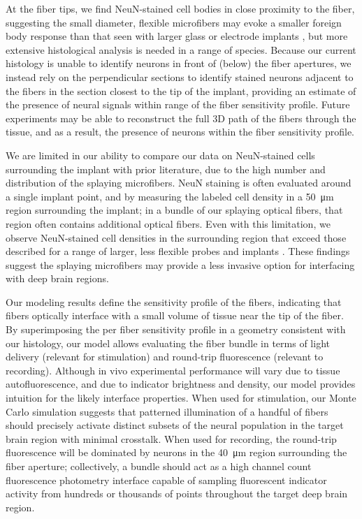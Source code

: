 At the fiber tips, we find NeuN-stained cell bodies in close 
proximity to the fiber, suggesting the small diameter, 
flexible microfibers may evoke a smaller foreign body response 
than that seen with larger glass or electrode implants 
\cite{McConnell:2009hr,Lee:2016ko}, but more extensive 
histological analysis is needed in a range of species. Because 
our current histology is unable to identify neurons in front of 
(below) the fiber apertures, we instead rely on the perpendicular 
sections to identify stained neurons adjacent to the fibers in 
the section closest to the tip of the implant, providing an 
estimate of the presence of neural signals within range of the 
fiber sensitivity profile. Future experiments may be able to 
reconstruct the full 3D path of the fibers through the tissue, 
and as a result, the presence of neurons within the fiber 
sensitivity profile. 

We are limited in our ability to compare our data on 
NeuN-stained cells surrounding the implant with prior 
literature, due to the high number and distribution of the 
splaying microfibers. NeuN staining is often evaluated around a 
single implant point, and by measuring the labeled cell density 
in a 50~\si{\micro\meter} region surrounding the implant; in a 
bundle of our splaying optical fibers, that region often 
contains additional optical fibers. Even with this limitation, 
we observe NeuN-stained cell densities in the surrounding region 
that exceed those described for a range of larger, less flexible 
probes and implants 
\cite{Biran:2005dm,Winslow:2010bn,Welkenhuysen:2011cu,Harris:2011dy}. 
These findings suggest the splaying microfibers may provide a less 
invasive option for interfacing with deep brain regions.

Our modeling results define the sensitivity profile of the 
fibers, indicating that fibers optically interface with a 
small volume of tissue near the tip of the fiber. By 
superimposing the per fiber sensitivity profile in a geometry 
consistent with our histology, our model allows evaluating 
the fiber bundle in terms of light delivery (relevant for 
stimulation) and round-trip fluorescence (relevant to recording). 
Although in vivo experimental performance will vary due to tissue 
autofluorescence, and due to indicator brightness and density, 
our model provides intuition for the likely interface properties. 
When used for stimulation, our Monte Carlo simulation suggests 
that patterned illumination of a handful of fibers should 
precisely activate distinct subsets of the neural population in 
the target brain region with minimal crosstalk. When used for 
recording, the round-trip fluorescence will be dominated by neurons 
in the 40~\si{\micro\meter} region surrounding the fiber aperture; collectively, 
a bundle should act as a high channel count fluorescence photometry 
interface capable of sampling fluorescent indicator activity from 
hundreds or thousands of points throughout the target deep brain 
region.

